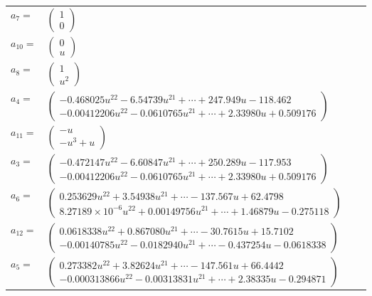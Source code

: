 \documentclass[1p]{elsarticle_modified}
\theoremstyle{definition}
\begin{document}
\begin{tabular}{m{7pt} m{180pt} m{7pt} m{180pt} }
\flushright $a_{7}=$&$\begin{pmatrix}1\\0\end{pmatrix}$ \\
\flushright $a_{10}=$&$\begin{pmatrix}0\\u\end{pmatrix}$ \\
\flushright $a_{8}=$&$\begin{pmatrix}1\\u^2\end{pmatrix}$ \\
\flushright $a_{4}=$&$\begin{pmatrix}-0.468025 u^{22}-6.54739 u^{21}+\cdots+247.949 u-118.462\\-0.00412206 u^{22}-0.0610765 u^{21}+\cdots+2.33980 u+0.509176\end{pmatrix}$ \\
\flushright $a_{11}=$&$\begin{pmatrix}- u\\- u^3+u\end{pmatrix}$ \\
\flushright $a_{3}=$&$\begin{pmatrix}-0.472147 u^{22}-6.60847 u^{21}+\cdots+250.289 u-117.953\\-0.00412206 u^{22}-0.0610765 u^{21}+\cdots+2.33980 u+0.509176\end{pmatrix}$ \\
\flushright $a_{6}=$&$\begin{pmatrix}0.253629 u^{22}+3.54938 u^{21}+\cdots-137.567 u+62.4798\\8.27189\times10^{-6} u^{22}+0.00149756 u^{21}+\cdots+1.46879 u-0.275118\end{pmatrix}$ \\
\flushright $a_{12}=$&$\begin{pmatrix}0.0618338 u^{22}+0.867080 u^{21}+\cdots-30.7615 u+15.7102\\-0.00140785 u^{22}-0.0182940 u^{21}+\cdots-0.437254 u-0.0618338\end{pmatrix}$ \\
\flushright $a_{5}=$&$\begin{pmatrix}0.273382 u^{22}+3.82624 u^{21}+\cdots-147.561 u+66.4442\\-0.000313866 u^{22}-0.00313831 u^{21}+\cdots+2.38335 u-0.294871\end{pmatrix}$ \\

\end{tabular}
\end{document}
